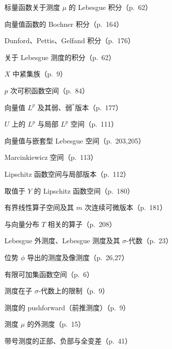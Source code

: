 \documentclass[../main.tex]{subfiles}
\begin{document}
\begin{description}[style=nextline,leftmargin=1.2em,itemsep=1pt,topsep=2pt,font=\normalfont\small]
\item[{$\int_X f\,\mathrm{d}\mu$（标量函数）}] 标量函数关于测度 $\mu$ 的 Lebesgue 积分（p.~62）
\item[{$\int_X f\,\mathrm{d}\mu$（向量函数）}] 向量值函数的 Bochner 积分（p.~164）
\item[{$\mathop{D\int_E f\,\mathrm{d}\mu(x)},\ \mathop{P\int_E f\,\mathrm{d}\mu(x)},\ \mathop{G\int_E f\,\mathrm{d}\mu(x)}$}] Dunford、Pettis、Gelfand 积分（p.~176）
\item[{$\int_D f\,\mathrm{d}x$}] 关于 Lebesgue 测度的积分（p.~62）
\item[{$\mathcal{K}$}] $X$ 中紧集族（p.~9）
\item[{$L^p(X),\ L^p(X,\mathcal{A},\mu)$}] $p$ 次可积函数空间（p.~84）
\item[{$L^p(X;Y),\ L^p_w(X;Y),\ L^p_{w^*}(X;Y^*)$}] 向量值 $L^p$ 及其弱、弱$^*$版本（p.~177）
\item[{$L^p(U),\ L^p_{\mathrm{loc}}(U)$}] $U$ 上的 $L^p$ 与局部 $L^p$ 空间（p.~111）
\item[{$L^p(U;Y),\ L^p(U;L^r(V)),\ L^p(U;W^{1,r}(V))$}] 向量值与嵌套型 Lebesgue 空间（p.~203,205）
\item[{$L^{r,p}(\mathbb{R}^N)$}] Marcinkiewicz 空间（p.~113）
\item[{$\operatorname{Lip}(U),\ \operatorname{Lip}_{\mathrm{loc}}(U)$}] Lipschitz 函数空间与局部版本（p.~112）
\item[{$\operatorname{Lip}(U;Y)$}] 取值于 $Y$ 的 Lipschitz 函数空间（p.~180）
\item[{$\mathcal{L}(U;Y),\ \mathcal{L}^m(U;Y)$}] 有界线性算子空间及其 $m$ 次连续可微版本（p.~181）
\item[{$L(T)$}] 与向量分布 $T$ 相关的算子（p.~208）
\item[{$\lambda_N^*,\ \lambda_N,\ \mathcal{L}_N,\ \mathcal{L}(\mathbb{R}^N)$}] Lebesgue 外测度、Lebesgue 测度及其 $\sigma$-代数（p.~23）
\item[{$(\lambda_\phi)^*,\ \lambda_\phi,\ \mathcal{L}_\phi,\ L_\phi(\mathbb{R}^N),\ \phi_\mu$}] 位势 $\phi$ 导出的测度及像测度（p.~26,27）
\item[{$\mathcal{M}_0(\mathcal{F})$}] 有限可加集函数空间（p.~6）
\item[{$\mu|_{\mathcal{A}\cap\mathcal{F}}$}] 测度在子 $\sigma$-代数上的限制（p.~9）
\item[{$\mu^\#$}] 测度的 pushforward（前推测度）（p.~9）
\item[{$\mu^*$}] 测度 $\mu$ 的外测度（p.~15）
\item[{$\mu^+,\ \mu^-,\ |\mu|$}] 带号测度的正部、负部与全变差（p.~41）

\end{description}
\end{document}
